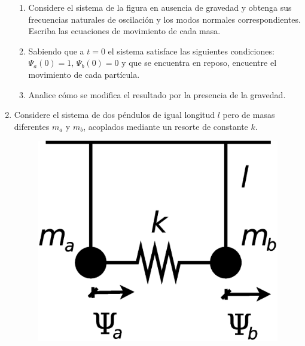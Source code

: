 \documentclass[11pt,spanish,a4paper]{article}
\begin{document}
\begin{enumerate}
\begin{enumerate}
\item Considere el sistema de la figura en ausencia de gravedad y obtenga
sus frecuencias naturales de oscilación y los modos normales correspondientes.
Escriba las ecuaciones de movimiento de cada masa.
\item Sabiendo que a $t=0$ el sistema satisface las siguientes condiciones:
$\Psi_{a}(0)=1,\,\Psi_{b}(0)=0$ y que se encuentra en reposo, encuentre
el movimiento de cada partícula. 
\item Analice cómo se modifica el resultado por la presencia de la gravedad.
\end{enumerate}
\item Considere el sistema de dos péndulos de igual longitud $l$ pero de
masas diferentes $m_{a}$ y $m_{b}$, acoplados mediante un resorte
de constante $k$. 
\begin{figure}[H]
\centering{}\includegraphics[clip,scale=0.3]{ej1-7}
\end{figure}



\end{enumerate}
\end{document}
